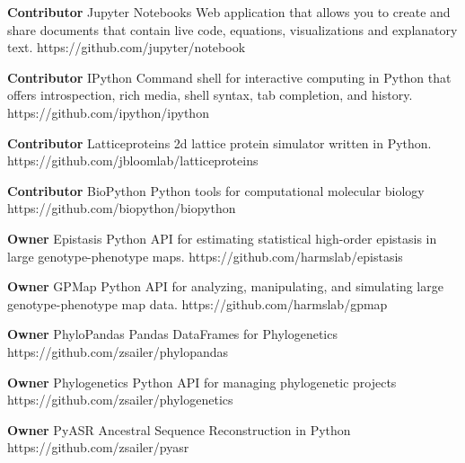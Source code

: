 \begin{cvossoftware}

  \cvoss
    {\textbf{Contributor} Jupyter Notebooks} %
    {Web application that allows you to create and share documents that contain live code, equations, visualizations and explanatory text.} %
    {https://github.com/jupyter/notebook} %

  \cvoss
    {\textbf{Contributor} IPython} %
    {Command shell for interactive computing in Python that offers introspection, rich media, shell syntax, tab completion, and history.}
    {https://github.com/ipython/ipython} %

  \cvoss
    {\textbf{Contributor} Latticeproteins} %
    {2d lattice protein simulator written in Python.}
    {https://github.com/jbloomlab/latticeproteins} %

  \cvoss
    {\textbf{Contributor} BioPython} %
    {Python tools for computational molecular biology}
    {https://github.com/biopython/biopython} %

  \cvoss
    {\textbf{Owner} Epistasis} %
    {Python API for estimating statistical high-order epistasis in large genotype-phenotype maps.}
    {https://github.com/harmslab/epistasis} %

  \cvoss
    {\textbf{Owner} GPMap} %
    {Python API for analyzing, manipulating, and simulating large genotype-phenotype map data.}
    {https://github.com/harmslab/gpmap} %

  \cvoss
    {\textbf{Owner} PhyloPandas} %
    {Pandas DataFrames for Phylogenetics}
    {https://github.com/zsailer/phylopandas} %

  \cvoss
    {\textbf{Owner} Phylogenetics} %
    {Python API for managing phylogenetic projects}
    {https://github.com/zsailer/phylogenetics} %


  \cvoss
    {\textbf{Owner} PyASR} %
    {Ancestral Sequence Reconstruction in Python}
    {https://github.com/zsailer/pyasr} %

\end{cvossoftware}
